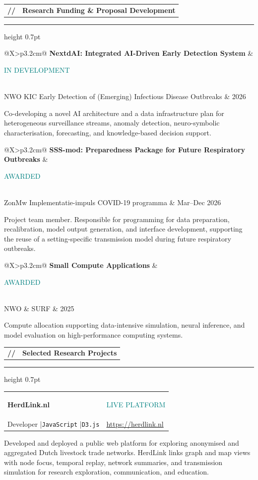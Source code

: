 \documentclass[10pt,a4paper]{article}
\makeatletter
\newcommand{\cvsection}[1]{%
  \Needspace{4\baselineskip}%
  \vspace{0.72em}%
  \noindent
  \begin{tabularx}{\textwidth}{@{}l@{\hspace{0.58em}}X@{}}
    {\color{Teal}\ttfamily\bfseries //} &
    {\large\bfseries\color{Teal} #1}
  \end{tabularx}
  \vspace{0.16em}\par
  {\color{Line}\hrule height 0.7pt}
  \vspace{0.42em}
}
\newcommand{\statusbadge}[2]{%
  \begingroup
  \setlength{\fboxsep}{3.2pt}%
  \colorbox{#1}{\textcolor{Teal}{\scriptsize\bfseries\strut #2}}%
  \endgroup
}
\newcommand{\fundingentry}[5]{%
  \Needspace{5\baselineskip}%
  \begin{tabularx}{\textwidth}{@{}X>{\raggedleft\arraybackslash}p{3.2cm}@{}}
    {\bfseries\color{Ink} #1} & #2 \\
    {\small\color{Muted} #3} & {\small\color{Muted} #4}
  \end{tabularx}
  \vspace{0.12em}
  #5
  \vspace{0.48em}
}
\newcommand{\tool}[1]{\texttt{\color{Navy}#1}}
\newcommand{\sep}{\enspace\textcolor{Line}{|}\enspace}
\makeatother
\begin{document}
\cvsection{Research Funding \& Proposal Development}

\fundingentry
  {NextdAI: Integrated AI-Driven Early Detection System}
  {\statusbadge{Warm}{IN DEVELOPMENT}}
  {NWO KIC Early Detection of (Emerging) Infectious Disease Outbreaks}
  {2026}
  {\begin{cvlist}
    \item Co-developing a novel AI architecture and a data infrastructure plan for heterogeneous
      surveillance streams, anomaly detection, neuro-symbolic characterisation,
      forecasting, and knowledge-based decision support.
  \end{cvlist}}

\fundingentry
  {SSS-mod: Preparedness Package for Future Respiratory Outbreaks}
  {\statusbadge{Pale}{AWARDED}}
  {ZonMw Implementatie-impuls COVID-19 programma}
  {Mar--Dec 2026}
  {\begin{cvlist}
    \item Project team member. Responsible for programming for data preparation,
      recalibration, model output generation, and interface development, supporting the reuse of a
      setting-specific transmission model during future respiratory outbreaks.
  \end{cvlist}}

\fundingentry
  {Small Compute Applications}
  {\statusbadge{Pale}{AWARDED}}
  {NWO \& SURF}
  {2025}
  {\begin{cvlist}
    \item Compute allocation supporting data-intensive simulation, neural inference, and model
      evaluation on high-performance computing systems.
  \end{cvlist}}

\cvsection{Selected Research Projects}

\begin{featurebox}
  \begin{tabularx}{\linewidth}{@{}X>{\raggedleft\arraybackslash}p{3.4cm}@{}}
    {\large\bfseries\color{Navy} HerdLink.nl} &
    {\statusbadge{white}{LIVE PLATFORM}} \\
    {\small\color{Muted} Developer \sep \tool{JavaScript} \sep \tool{D3.js}} &
    {\small\href{https://herdlink.nl}{https://herdlink.nl}}
  \end{tabularx}
  \vspace{0.25em}

  Developed and deployed a public web platform for exploring anonymised and aggregated Dutch
  livestock trade networks. HerdLink links graph and map views with node focus, temporal replay,
  network summaries, and transmission simulation for research exploration, communication, and education.
\end{featurebox}
\end{document}
